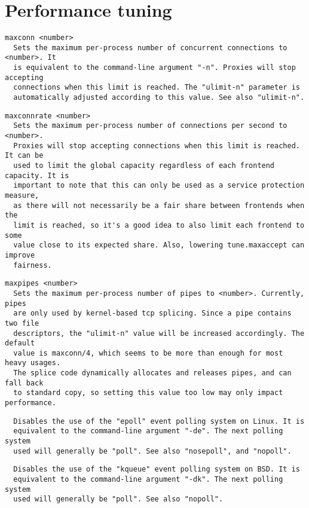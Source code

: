 
\section{Performance tuning}
\begin{verbatim}
maxconn <number>
  Sets the maximum per-process number of concurrent connections to <number>. It
  is equivalent to the command-line argument "-n". Proxies will stop accepting
  connections when this limit is reached. The "ulimit-n" parameter is
  automatically adjusted according to this value. See also "ulimit-n".
\end{verbatim}

\begin{verbatim}
maxconnrate <number>
  Sets the maximum per-process number of connections per second to <number>.
  Proxies will stop accepting connections when this limit is reached. It can be
  used to limit the global capacity regardless of each frontend capacity. It is
  important to note that this can only be used as a service protection measure,
  as there will not necessarily be a fair share between frontends when the
  limit is reached, so it's a good idea to also limit each frontend to some
  value close to its expected share. Also, lowering tune.maxaccept can improve
  fairness.
\end{verbatim}

\begin{verbatim}
maxpipes <number>
  Sets the maximum per-process number of pipes to <number>. Currently, pipes
  are only used by kernel-based tcp splicing. Since a pipe contains two file
  descriptors, the "ulimit-n" value will be increased accordingly. The default
  value is maxconn/4, which seems to be more than enough for most heavy usages.
  The splice code dynamically allocates and releases pipes, and can fall back
  to standard copy, so setting this value too low may only impact performance.
\end{verbatim}

\begin{verbatim}
  Disables the use of the "epoll" event polling system on Linux. It is
  equivalent to the command-line argument "-de". The next polling system
  used will generally be "poll". See also "nosepoll", and "nopoll".
\end{verbatim}

\begin{verbatim}
  Disables the use of the "kqueue" event polling system on BSD. It is
  equivalent to the command-line argument "-dk". The next polling system
  used will generally be "poll". See also "nopoll".
\end{verbatim}

